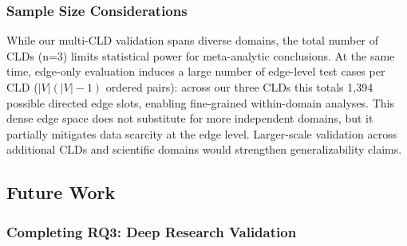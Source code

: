 \subsubsection{Sample Size Considerations}

While our multi-CLD validation spans diverse domains, the total number of CLDs (n=3) limits statistical power for meta-analytic conclusions. At the same time, edge-only evaluation induces a large number of edge-level test cases per CLD ($|V|(|V|-1)$ ordered pairs): across our three CLDs this totals 1,394 possible directed edge slots, enabling fine-grained within-domain analyses. This dense edge space does not substitute for more independent domains, but it partially mitigates data scarcity at the edge level. Larger-scale validation across additional CLDs and scientific domains would strengthen generalizability claims.

\subsection{Future Work}
\label{sec:discussion_future}

\subsubsection{Completing RQ3: Deep Research Validation}

